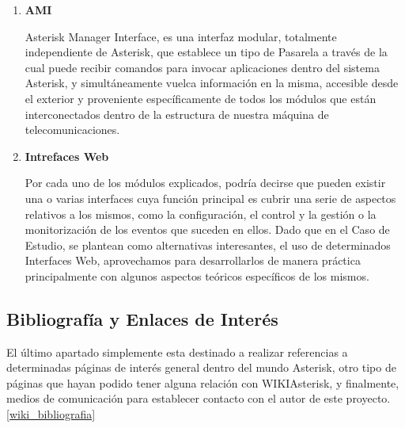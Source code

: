 \begin{enumerate}
	\item \textbf{AMI}
	
	Asterisk Manager Interface, es una interfaz modular, totalmente independiente de Asterisk, que establece un tipo de Pasarela a través de la cual puede recibir comandos para invocar aplicaciones dentro del sistema Asterisk, y simultáneamente vuelca información en la misma, accesible desde el exterior y proveniente específicamente de todos los módulos que están interconectados dentro de la estructura de nuestra máquina de telecomunicaciones.
	
	\item \textbf{Intrefaces Web}
	
	Por cada uno de los módulos explicados, podría decirse que pueden existir una o varias interfaces cuya función principal es cubrir una serie de aspectos relativos a los mismos, como la configuración, el control y la gestión o la monitorización de los eventos que suceden en ellos. Dado que en el Caso de Estudio, se plantean como alternativas interesantes, el uso de determinados Interfaces Web, aprovechamos para desarrollarlos de manera práctica principalmente con algunos aspectos teóricos específicos de los mismos.
	
\end{enumerate}


\subsection{Bibliografía y Enlaces de Interés}

El último apartado simplemente esta destinado a realizar referencias a determinadas páginas de interés general dentro del mundo Asterisk, otro tipo de páginas que hayan podido tener alguna relación con WIKIAsterisk, y finalmente, medios de comunicación para establecer contacto con el autor de este proyecto. \ref{wiki_bibliografia}

